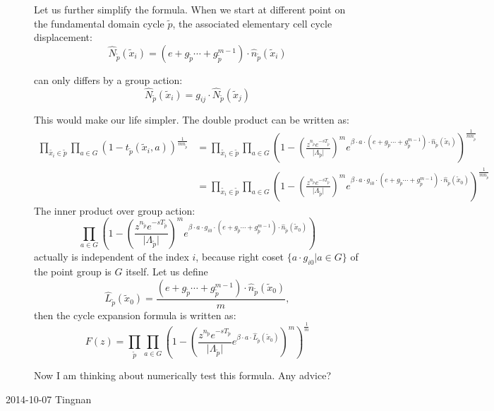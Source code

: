 \begin{description}
Let us further simplify the formula. When we start at different point
on the fundamental domain cycle $\tilde{p}$, the associated elementary
cell cycle displacement: 
\[
\hat{N}_{\tilde{p}}(\tilde{x}_{i})=(e+g_{\tilde{p}}\cdots+g_{\tilde{p}}^{m-1})\cdot\hat{n}_{\tilde{p}}(\tilde{x}_{i})
\]


can only differs by a group action:
\[
\hat{N}_{\tilde{p}}(\tilde{x}_{i})=g_{ij}\cdot\hat{N}_{\tilde{p}}(\tilde{x}_{j})
\]


This would make our life simpler. The double product can be written
as:
\begin{align*}
\prod_{\tilde{x_{i}}\in\tilde{p}}\prod_{a\in G}\left(1-t_{\tilde{p}}(\tilde{x}_{i},a)\right)^{\frac{1}{mn_{\tilde{p}}}} & =\prod_{\tilde{x_{i}}\in\tilde{p}}\prod_{a\in G}\left(1-\left(\frac{z^{n_{\tilde{p}}}e^{-sT_{\tilde{p}}}}{\vert\Lambda_{\tilde{p}}\vert}\right)^{m}e^{\beta\cdot a\cdot(e+g_{\tilde{p}}\cdots+g_{\tilde{p}}^{m-1})\cdot\hat{n}_{\tilde{p}}(\tilde{x}_{i})}\right)^{\frac{1}{mn_{\tilde{p}}}}\\
 & =\prod_{\tilde{x_{i}}\in\tilde{p}}\prod_{a\in G}\left(1-\left(\frac{z^{n_{\tilde{p}}}e^{-sT_{\tilde{p}}}}{\vert\Lambda_{\tilde{p}}\vert}\right)^{m}e^{\beta\cdot a\cdot g_{i0}\cdot(e+g_{\tilde{p}}\cdots+g_{\tilde{p}}^{m-1})\cdot\hat{n}_{\tilde{p}}(\tilde{x}_{0})}\right)^{\frac{1}{mn_{\tilde{p}}}}
\end{align*}
The inner product over group action:
\[
\prod_{a\in G}\left(1-\left(\frac{z^{n_{\tilde{p}}}e^{-sT_{\tilde{p}}}}{\vert\Lambda_{\tilde{p}}\vert}\right)^{m}e^{\beta\cdot a\cdot g_{i0}\cdot(e+g_{\tilde{p}}\cdots+g_{\tilde{p}}^{m-1})\cdot\hat{n}_{\tilde{p}}(\tilde{x}_{0})}\right)
\]
actually is independent of the index $i$, because right coset $\{a\cdot g_{i0}\vert a\in G\}$
of the point group is $G$ itself. Let us define 
\[
\hat{L}_{\tilde{p}}(\tilde{x}_{0})=\frac{(e+g_{\tilde{p}}\cdots+g_{\tilde{p}}^{m-1})\cdot\hat{n}_{\tilde{p}}(\tilde{x}_{0})}{m},
\]
then the cycle expansion formula is written as:
\[
F(z)=\prod_{\tilde{p}}\prod_{a\in G}\left(1-\left(\frac{z^{n_{\tilde{p}}}e^{-sT_{\tilde{p}}}}{\vert\Lambda_{\tilde{p}}\vert}e^{\beta\cdot a\cdot\hat{L}_{\tilde{p}}(\tilde{x}_{0})}\right)^{m}\right)^{\frac{1}{m}}
\]

Now I am thinking about numerically test this formula. Any advice?


\item[2014-10-07 Tingnan]



\end{description}
